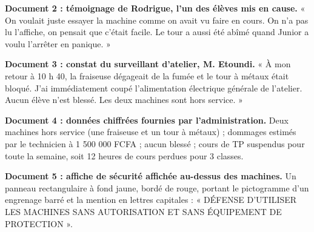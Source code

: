 \documentclass[11pt]{article}
\newcounter{popsec}
\newcounter{popsub}
\newcommand{\courssub}[1]{%
  \stepcounter{popsub}%
  \par\vspace{9pt}\noindent{\popxbold\fontsize{11.5}{13}\selectfont\color{popink}{\color{poporange}\thepopsec.\thepopsub}\hspace{6pt}#1}\par\nopagebreak\vspace{4pt}
}
\begin{document}
\textbf{Document 2 : témoignage de Rodrigue, l'un des élèves mis en cause.} « On voulait juste essayer la machine comme on avait vu faire en cours. On n'a pas lu l'affiche, on pensait que c'était facile. Le tour a aussi été abîmé quand Junior a voulu l'arrêter en panique. »

\textbf{Document 3 : constat du surveillant d'atelier, M. Etoundi.} « À mon retour à 10 h 40, la fraiseuse dégageait de la fumée et le tour à métaux était bloqué. J'ai immédiatement coupé l'alimentation électrique générale de l'atelier. Aucun élève n'est blessé. Les deux machines sont hors service. »

\textbf{Document 4 : données chiffrées fournies par l'administration.} Deux machines hors service (une fraiseuse et un tour à métaux) ; dommages estimés par le technicien à 1 500 000 FCFA ; aucun blessé ; cours de TP suspendus pour toute la semaine, soit 12 heures de cours perdues pour 3 classes.

\textbf{Document 5 : affiche de sécurité affichée au-dessus des machines.} Un panneau rectangulaire à fond jaune, bordé de rouge, portant le pictogramme d'un engrenage barré et la mention en lettres capitales : « DÉFENSE D'UTILISER LES MACHINES SANS AUTORISATION ET SANS ÉQUIPEMENT DE PROTECTION ».

\courssub{Consignes}
\end{document}

